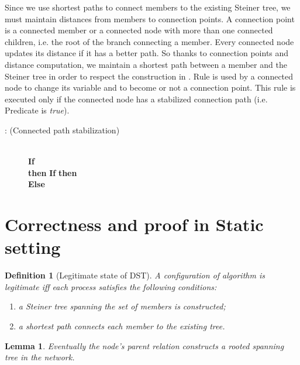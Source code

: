 \documentclass[11pt]{article}
\newtheorem{definition}{Definition}
\newtheorem{lemma}{Lemma}
\newcommand{\CRF}{}
\begin{document}
Since we use shortest paths to connect members to the existing Steiner
tree, we must maintain distances from members to 
connection points. A connection point is a connected member or a connected node with more than one connected children, i.e. the root of the branch connecting a member. Every connected node updates its distance if it has a better path. So thanks to connection points and distance computation, we maintain a shortest path between a member and the Steiner tree in order to respect the construction in \cite{ImaseWaxman91}. Rule \CRF\/ is used by a connected node to change its variable  and to become or not a connection point. This rule is executed only if the connected node has a stabilized connection path (i.e. Predicate  is \emph{true}).


\begin{small}
\begin{description}
\item[\CRF: (Connected path stabilization)]~\\\textbf{If} \\ 
\textbf{then} \hspace*{0,1cm}\textbf{If}  \textbf{then}  \\ \hspace*{0,8cm}\textbf{Else} 
\end{description}
\end{small}

\section{Correctness and proof in Static setting}
\label{sec:correction}

\begin{definition}[Legitimate state of DST]
\label{def:legitimate_state}
A configuration of algorithm is legitimate iff each process  satisfies the following conditions:
\begin{enumerate}
\item a Steiner tree  spanning the set of members  is constructed;
\item a shortest path connects each member  to the existing tree.
\end{enumerate}
\end{definition}



\begin{lemma}
\label{lem:correct1}
Eventually the node's parent relation constructs a rooted spanning tree in the network.
\end{lemma}
\end{document}
